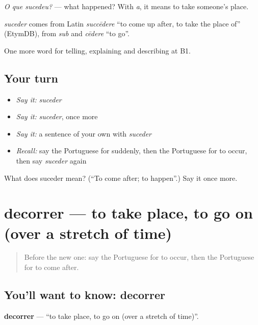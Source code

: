 \emph{O que sucedeu?} — what happened? With \emph{a}, it means to take someone’s place.

\begin{cousinweb}
\emph{suceder} comes from Latin \emph{succēdere} \textquotedblleft{}to come up after, to take the place of\textquotedblright{} (EtymDB), from \emph{sub} and \emph{cēdere} \textquotedblleft{}to go\textquotedblright{}.
\end{cousinweb}

\begin{grammarlens}[title={What you've built}]
One more word for telling, explaining and describing at B1.
\end{grammarlens}

\subsection*{Your turn}
\begin{itemize}
\raggedright
  \item \emph{Say it:} \emph{suceder}
  \item \emph{Say it:} \emph{suceder}, once more
  \item \emph{Say it:} a sentence of your own with \emph{suceder}
  \item \emph{Recall:} say the Portuguese for suddenly, then the Portuguese for to occur, then say \emph{suceder} again
\end{itemize}

\begin{tcolorbox}[breakable,colback=teal!4,colframe=teal!35!black,title={Before you move on}]
What does suceder mean? (\textquotedblleft{}To come after; to happen\textquotedblright{}.) Say it once more.
\end{tcolorbox}
\section[decorrer]{decorrer — to take place, to go on (over a stretch of time)}

\label{lesson:PT-C271-decorrer}



\begin{quote}
Before the new one: say the Portuguese for to occur, then the Portuguese for to come after.
\end{quote}

\subsection*{You'll want to know: decorrer}
\textbf{decorrer} — \textquotedblleft{}to take place, to go on (over a stretch of time)\textquotedblright{}.

